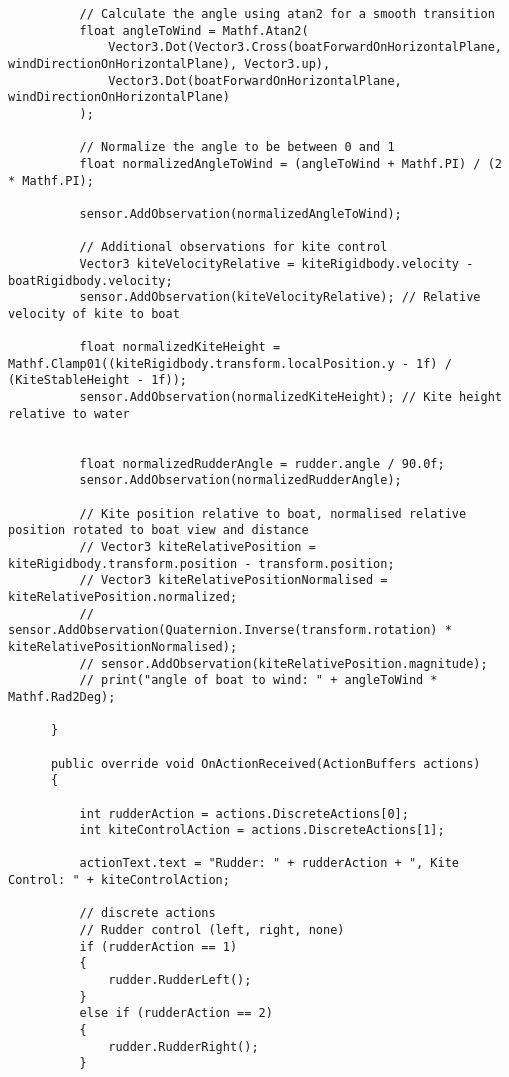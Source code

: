\begin{lstlisting}
          // Calculate the angle using atan2 for a smooth transition
          float angleToWind = Mathf.Atan2(
              Vector3.Dot(Vector3.Cross(boatForwardOnHorizontalPlane, windDirectionOnHorizontalPlane), Vector3.up),
              Vector3.Dot(boatForwardOnHorizontalPlane, windDirectionOnHorizontalPlane)
          );
  
          // Normalize the angle to be between 0 and 1
          float normalizedAngleToWind = (angleToWind + Mathf.PI) / (2 * Mathf.PI);
  
          sensor.AddObservation(normalizedAngleToWind);
  
          // Additional observations for kite control
          Vector3 kiteVelocityRelative = kiteRigidbody.velocity - boatRigidbody.velocity;
          sensor.AddObservation(kiteVelocityRelative); // Relative velocity of kite to boat
  
          float normalizedKiteHeight = Mathf.Clamp01((kiteRigidbody.transform.localPosition.y - 1f) / (KiteStableHeight - 1f));
          sensor.AddObservation(normalizedKiteHeight); // Kite height relative to water
  
  
          float normalizedRudderAngle = rudder.angle / 90.0f;
          sensor.AddObservation(normalizedRudderAngle);
  
          // Kite position relative to boat, normalised relative position rotated to boat view and distance
          // Vector3 kiteRelativePosition = kiteRigidbody.transform.position - transform.position;
          // Vector3 kiteRelativePositionNormalised = kiteRelativePosition.normalized;
          // sensor.AddObservation(Quaternion.Inverse(transform.rotation) * kiteRelativePositionNormalised);
          // sensor.AddObservation(kiteRelativePosition.magnitude);
          // print("angle of boat to wind: " + angleToWind * Mathf.Rad2Deg);
  
      }
  
      public override void OnActionReceived(ActionBuffers actions)
      {
  
          int rudderAction = actions.DiscreteActions[0];
          int kiteControlAction = actions.DiscreteActions[1];
  
          actionText.text = "Rudder: " + rudderAction + ", Kite Control: " + kiteControlAction;
  
          // discrete actions
          // Rudder control (left, right, none)
          if (rudderAction == 1)
          {
              rudder.RudderLeft();
          }
          else if (rudderAction == 2)
          {
              rudder.RudderRight();
          }
  

\end{lstlisting}
